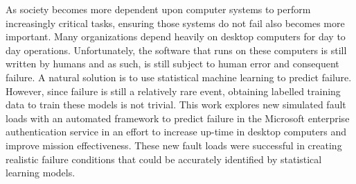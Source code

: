 As society becomes more dependent upon computer systems to perform increasingly
critical tasks, ensuring those systems do not fail also becomes more important.
Many organizations depend heavily on desktop computers for day to day
operations. Unfortunately, the software that runs on these computers is still
written by humans and as such, is still subject to human error and consequent
failure. A natural solution is to use statistical machine learning to predict
failure. However, since failure is still a relatively rare event, obtaining
labelled training data to train these models is not trivial. This work explores
new simulated fault loads with an automated framework to predict failure in the
Microsoft enterprise authentication service in an effort to increase up-time in
desktop computers and improve mission effectiveness.  These new fault loads
were successful in creating realistic failure conditions that could be
accurately identified by statistical learning models.

